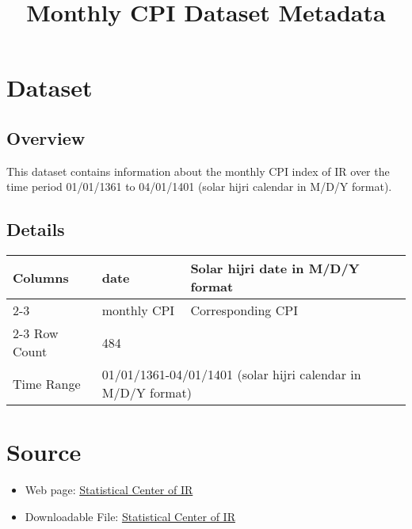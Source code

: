 \documentclass[fleqn]{report}
\begin{document}
\pagestyle{fancy}
\fancyhf{}

\title{Monthly CPI Dataset Metadata}
\date{}
\maketitle

\newpage

\chapter*{Dataset}
\section*{Overview}
This dataset contains information about the monthly CPI index of IR over the time period 01/01/1361 to 04/01/1401 (solar hijri calendar in M/D/Y format).
\section*{Details}
\begin{center}
    \begin{tabular}{|l|ll|}
        \hline
        \multirow{3}{*}{Columns} & \multicolumn{1}{l|}{date}        & Solar hijri date in M/D/Y format            \\ \cline{2-3} 
                                 & \multicolumn{1}{l|}{monthly CPI}  & Corresponding CPI                           \\ \cline{2-3} \hline
        Row Count                & \multicolumn{2}{l|}{484}                                                        \\ \hline
        Time Range               & \multicolumn{2}{l|}{01/01/1361-04/01/1401  (solar hijri calendar in M/D/Y format)}                         \\ \hline
    \end{tabular}
\end{center}

\chapter*{Source}
\begin{itemize}
    \item Web page: \href{https://www.amar.org.ir/%D8%AF%D8%A7%D8%AF%D9%87%D9%87%D8%A7-%D9%88-%D8%A7%D8%B7%D9%84%D8%A7%D8%B9%D8%A7%D8%AA-%D8%A2%D9%85%D8%A7%D8%B1%DB%8C/%D8%B4%D8%A7%D8%AE%D8%B5%D9%87%D8%A7%DB%8C-%D9%82%DB%8C%D9%85%D8%AA/%D8%B4%D8%A7%D8%AE%D8%B5-%D9%82%DB%8C%D9%85%D8%AA-%D9%85%D8%B5%D8%B1%D9%81-%DA%A9%D9%86%D9%86%D8%AF%D9%87#5645851--}{Statistical Center of IR}
    \item Downloadable File: \href{https://www.amar.org.ir/Portals/0/PropertyAgent/461/Files/13026/2302u220940104.xlsx}{Statistical Center of IR}
\end{itemize}

 
\end{document}
